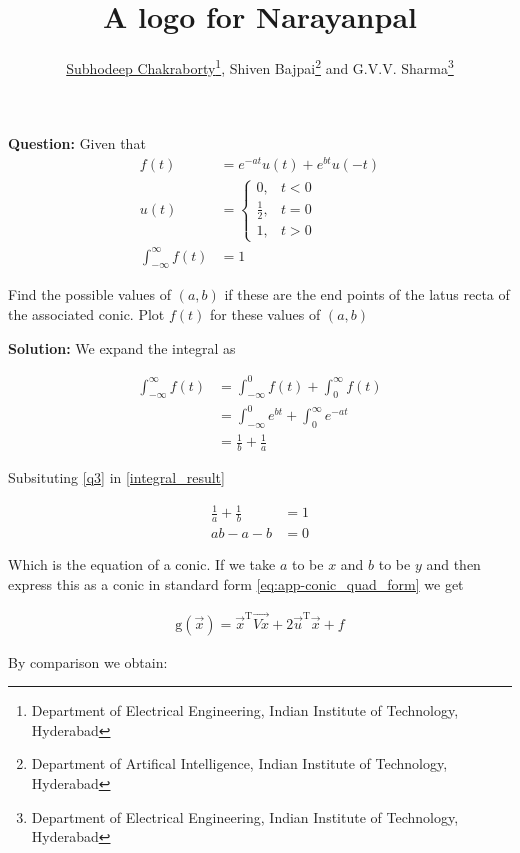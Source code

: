\documentclass{article}
\date{}
\title{\bfseries\large{A logo for Narayanpal}}
\author{\underline{Subhodeep Chakraborty}\footnote{Department of Electrical Engineering, Indian Institute of Technology, Hyderabad}, Shiven Bajpai\footnote{Department of Artifical Intelligence, Indian Institute of Technology, Hyderabad} and G.V.V. Sharma\footnote{Department of Electrical Engineering, Indian Institute of Technology, Hyderabad}}
\numberwithin{equation}{section}
\numberwithin{figure}{section}
\begin{document}
\maketitle
\vspace{-0.4cm}

\textbf{Question: } Given that
\begin{subequations}
\begin{align}
	f(t) &= e^{-at}u(t) + e^{bt}u(-t) \label{q1} \\
	u(t) &= \begin{cases}
		0, & t<0\\
		\frac{1}{2}, & t=0 \\
		1, & t>0
		\end{cases} \label{q2} \\
	\int_{-\infty}^{\infty} f(t) &= 1 \label{q3}
\end{align}
\end{subequations}

Find the possible values of $(a,b)$ if these are the end points of the latus recta of the associated conic. Plot $f(t)$ for these values of $(a,b)$

\bigskip

\textbf{Solution: } We expand the integral as 

\begin{align}
	\int_{-\infty}^{\infty} f(t) &= \int_{-\infty}^{0} f(t) + \int_{0}^{\infty} f(t)\\
	&= \int_{-\infty}^{0} e^{bt} + \int_{0}^{\infty} e^{-at}\\
	&= \frac{1}{b} + \frac{1}{a} \label{integral_result}
\end{align}

Subsituting \eqref{q3} in \eqref{integral_result}

\begin{align}
	\frac{1}{a} + \frac{1}{b} &= 1 \label{eq:cond_ab}\\
	ab - a - b &= 0 \label{conic_ab}
\end{align}

Which is the equation of a conic. 
If we take $a$ to be $x$ and $b$ to be $y$ and then express this as a conic in standard form \eqref{eq:app-conic_quad_form} we get

\begin{align}
	\text{g}(\vec{x}) = \vec{x}^\text{T}\vec{Vx} + 2\vec{u}^\text{T}\vec{x} + f \label{actual_conic}
\end{align}

By comparison we obtain:
\end{document}
